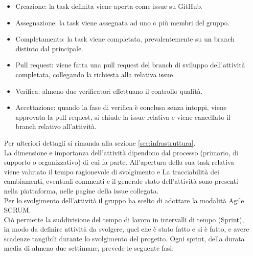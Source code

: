 \begin{itemize}
  \item{Creazione: la task definita viene aperta come issue su GitHub.}
  \item{Assegnazione: la task viene assegnata ad uno o più membri del gruppo.}
  \item{Completamento: la task viene completata, prevalentemente su un branch distinto dal principale.}
  \item{Pull request: viene fatta una pull request del branch di sviluppo dell'attività completata, collegando la richiesta alla relativa issue.}
  \item{Verifica: almeno due verificatori effettuano il controllo qualità.}
  \item{Accettazione: quando la fase di verifica è conclusa senza intoppi, viene approvata la pull request, si chiude la issue relativa e viene cancellato il branch relativo all'attività.}
\end{itemize}
Per ulteriori dettagli si rimanda alla sezione \hyperref[sec:infrastruttura]{\ref{sec:infrastruttura}}.\\
La dimensione e importanza dell'attività dipendono dal processo (primario, di supporto o organizzativo) di cui fa parte. All'apertura della sua task relativa viene valutato il tempo ragionevole di svolgimento e 
La tracciabilità dei cambiamenti, eventuali commenti e il generale stato dell'attività sono presenti nella piattaforma, nelle pagine della issue collegata.
\\
Per lo svolgimento dell'attività il gruppo ha scelto di adottare la modalità Agile SCRUM.\\
Ciò permette la suddivisione del tempo di lavoro in intervalli di tempo (Sprint), in modo da definire attività da svolgere, quel che è stato fatto e si è fatto, e avere scadenze tangibili durante lo svolgimento del progetto.
Ogni sprint, della durata media di almeno due settimane, prevede le seguente fasi:
